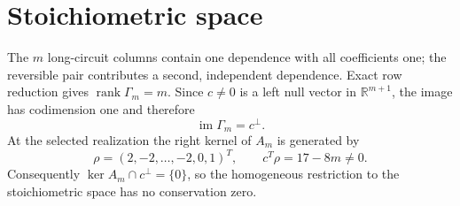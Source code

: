 \section*{Stoichiometric space}
The $m$ long-circuit columns contain one dependence with all coefficients one;
the reversible pair contributes a second, independent dependence.  Exact row
reduction gives $\operatorname{rank}\Gamma_m=m$.  Since $c\neq0$ is a left
null vector in $\mathbb R^{m+1}$, the image has codimension one and therefore
\[
\operatorname{im}\Gamma_m=c^\perp.
\]
At the selected realization the right kernel of $A_m$ is generated by
\[
\rho=(2,-2,\ldots,-2,0,1)^T,
\qquad c^T\rho=17-8m\neq0.
\]
Consequently $\ker A_m\cap c^\perp=\{0\}$, so the homogeneous restriction to
the stoichiometric space has no conservation zero.
